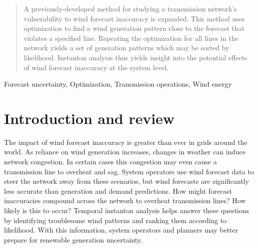 \documentclass[conference]{IEEEtran}
\begin{document}
\begin{abstract}
A previously-developed method for studying a transmission network's vulnerability to wind forecast inaccuracy is expanded. This method uses optimization to find a wind generation pattern close to the forecast that violates a specified line. Repeating the optimization for all lines in the network yields a set of generation patterns which may be sorted by likelihood. Instanton analysis thus yields insight into the potential effects of wind forecast inaccuracy at the system level.
\end{abstract}

\begin{IEEEkeywords}
Forecast uncertainty, Optimization, Transmission operations, Wind energy
\end{IEEEkeywords}


\section{Introduction and review}\label{sec:intro}

The impact of wind forecast inaccuracy is greater than ever in grids around the world. As reliance on wind generation increases, changes in weather can induce network congestion. In certain cases this congestion may even cause a transmission line to overheat and sag. System operators use wind forecast data to steer the network away from these scenarios, but wind forecasts are significantly less accurate than generation and demand predictions. How might forecast inaccuracies compound across the network to overheat transmission lines? How likely is this to occur? Temporal instanton analysis helps answer these questions by identifying troublesome wind patterns and ranking them according to likelihood. With this information, system operators and planners may better prepare for renewable generation uncertainty.
\end{document}
